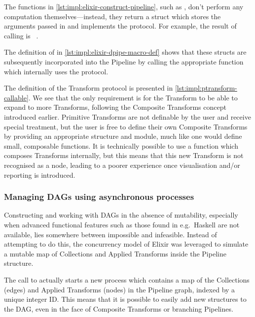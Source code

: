 The functions in \cref{lst:impl:elixir-construct-pipeline}, such as , don't perform any computation themselves---instead, they return a struct which stores the arguments passed in and implements the  protocol.
For example, the result of calling \linebreak {} is \texttt{
}.

The definition of \exs{~>} in \cref{lst:impl:elixir-dpipe-macro-def} shows that these structs are subsequently incorporated into the Pipeline by calling the appropriate function which internally uses the protocol.

The definition of the Transform protocol is presented in \cref{lst:impl:ptransform-callable}.
We see that the only requirement is for the Transform to be able to expand to more Transforms, following the Composite Transforms concept introduced earlier.
Primitive Transforms are not definable by the user and receive special treatment, but the user is free to define their own Composite Transforms by providing an appropriate structure and module, much like one would define small, composable functions.
It is technically possible to use a function which composes Transforms internally, but this means that this new Transform is not recognised as a node, leading to a poorer experience once visualisation and/or reporting is introduced.


\subsubsection{Managing DAGs using asynchronous processes}


Constructing and working with DAGs in the absence of mutability, especially when advanced functional features such as those found in e.g.\ Haskell are not available, lies somewhere between impossible and infeasible.
Instead of attempting to do this, the concurrency model of Elixir was leveraged to simulate a mutable map of Collections and Applied Transforms inside the Pipeline structure.


The call to  actually starts a new process which contains a map of the Collections (edges) and Applied Transforms (nodes) in the Pipeline graph, indexed by a unique integer ID.
This means that it is possible to easily add new structures to the DAG, even in the face of Composite Transforms or branching Pipelines.

